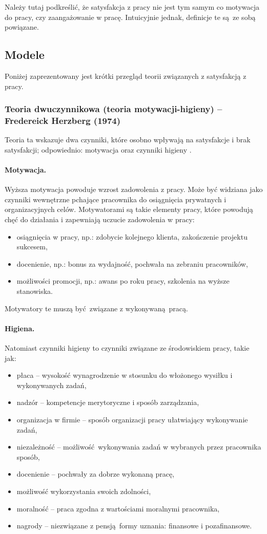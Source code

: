 Należy tutaj podkreślić, że satysfakcja z pracy nie jest tym samym co motywacja do pracy, czy zaangażowanie w pracę. Intuicyjnie jednak, definicje te są ze sobą powiązane.

\subsection{Modele}
Poniżej zaprezentowany jest krótki przegląd teorii związanych z satysfakcją z pracy.

\subsubsection{Teoria dwuczynnikowa (teoria motywacji-higieny) -- Fredereick Herzberg (1974)}
\label{sec:theory-sat-herz}
Teoria ta wskazuje dwa czynniki, które osobno wpływają na satysfakcje i brak satysfakcji; odpowiednio: motywacja oraz czynniki higieny \citep{herzberg1974motivation}. 

\paragraph{Motywacja.} Wyższa motywacja powoduje wzrost zadowolenia z pracy. Może być widziana jako czynniki wewnętrzne pchające pracownika do osiągnięcia prywatnych i organizacyjnych celów. Motywatorami są takie elementy pracy, które powodują chęć do działania i zapewniają uczucie zadowolenia w pracy:
\begin{itemize}
\item osiągnięcia w pracy, np.: zdobycie kolejnego klienta, zakończenie projektu sukcesem,
\item docenienie, np.: bonus za wydajność, pochwała na zebraniu pracowników,
\item możliwości promocji, np.: awans po roku pracy, szkolenia na wyższe stanowiska.
\end{itemize}
Motywatory te muszą być związane z wykonywaną pracą.

\paragraph{Higiena.} Natomiast czynniki higieny to czynniki związane ze środowiskiem pracy, takie jak:
\begin{itemize}
\item płaca -- wysokość wynagrodzenie w stosunku do włożonego wysiłku i wykonywanych zadań, 
\item nadzór -- kompetencje merytoryczne i sposób zarządzania,
\item organizacja w firmie -- sposób organizacji pracy ułatwiający wykonywanie zadań, 
\item niezależność -- możliwość wykonywania zadań w wybranych przez pracownika sposób,
\item docenienie -- pochwały za dobrze wykonaną pracę,
\item możliwość wykorzystania swoich zdolności,
\item moralność -- praca zgodna z wartościami moralnymi pracownika,
\item nagrody -- niezwiązane z pensją formy uznania: finansowe i pozafinansowe.
\end{itemize}

